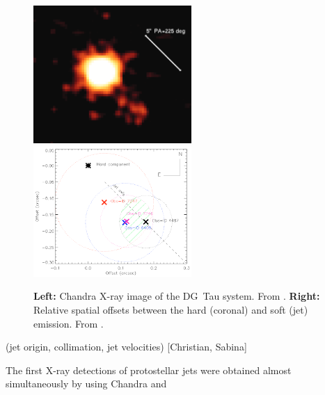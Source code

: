 \begin{figure}[t]

\includegraphics[width=6cm]{figs/dg_tau_X}
\includegraphics[width=6cm]{figs/dg_tau_offsets}

\caption{{\bf Left: } Chandra X-ray image of the DG~Tau system. From \citet{2011ASPC..448..617G}.
         {\bf Right: } Relative spatial offsets between the hard (coronal) and soft (jet) emission. From \citet{Schneider_2008}. \label{fig:dg_tau_X}}
\end{figure}




{\color{blue}(jet origin, collimation, jet velocities) [Christian, Sabina]}


% 
% 
% 


The first X-ray detections of protostellar jets were obtained almost simultaneously by \citet{Pravdo_2001} using Chandra and \citet{Favata_2002}

